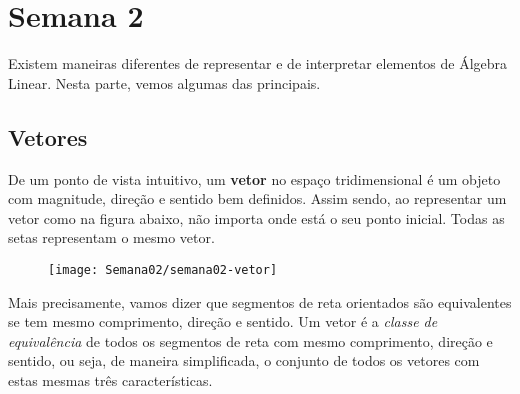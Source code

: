 

\providecommand{\dir}{..}


%

\chapter{Semana 2}

\vspace{0.5cm}

Existem maneiras diferentes de representar e de interpretar elementos de Álgebra Linear. Nesta parte, vemos algumas das principais.


\section{Vetores}

De um ponto de vista intuitivo, um \textbf{vetor} no espaço tridimensional é um objeto com magnitude, direção e sentido bem definidos. Assim sendo, ao representar um vetor como na figura abaixo, não importa onde está o seu ponto inicial. Todas as setas representam o mesmo vetor.


\begin{figure}[h!]
	\begin{center}
		\texttt{[image: Semana02/semana02-vetor]}
	\end{center}
\end{figure}

Mais precisamente, %
vamos dizer que segmentos de reta orientados  são equivalentes se tem mesmo comprimento, direção e sentido. Um vetor é a {\it classe de equivalência} de todos os segmentos de reta com mesmo comprimento, direção e sentido, ou seja, de maneira simplificada, o conjunto de todos os vetores com estas mesmas três características.


